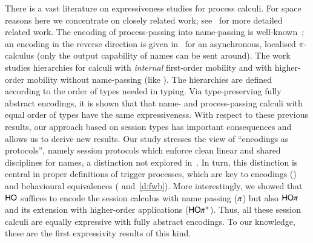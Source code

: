 There is a vast literature on expressiveness studies for process calculi. 
For space reasons here we concentrate on closely related work; 
see~\cite{KouzapasPY15} for more detailed related work. 
%
The encoding of process-passing into name-passing is well-known~\cite{SangiorgiD:expmpa};
an encoding in the reverse direction 
is given in~\cite{SaWabook} for an asynchronous, localised $\pi$-calculus
(only the output capability of names can be sent around).  The
work~\cite{San96int} studies hierarchies for calculi with
\emph{internal} first-order mobility and with higher-order mobility
without name-passing (like \HO). The
hierarchies are %
defined according to
the order of types needed in typing. 
Via type-preserving fully abstract encodings, it is shown that that
name- and process-passing calculi with equal order of types have the
same expressiveness.  With respect to these previous results, our
approach based on session types has important consequences and
allows us to derive new results.  
Our study stresses the 
view of ``encodings as protocols'', namely session protocols which
enforce clean linear and shared disciplines for names, a distinction
not explored in~\cite{SangiorgiD:expmpa,DBLP:journals/tcs/Sangiorgi01}. In
turn, this distinction is central in proper definitions
of trigger processes, which are key to encodings
() and behavioural equivalences
( and~\ref{d:fwb}).  More interestingly, we showed that
$\mathsf{HO}$ suffices to encode  the session
calculus with name passing ($\pi$) but also $\mathsf{HO}\pi$ and its extension with
higher-order applications ($\mathsf{HO\pi^{+}}$). 
Thus, %
all these session calculi are equally expressive with fully
abstract encodings.  To our knowledge, these are the first
expressivity results of this kind.

